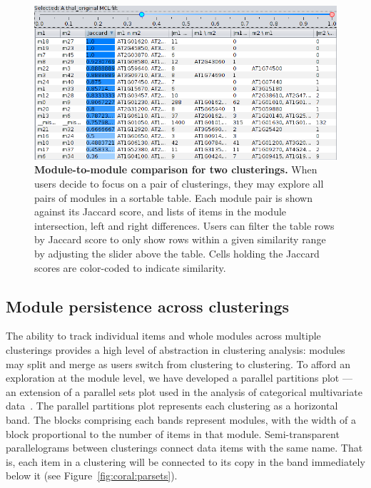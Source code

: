 \documentclass[12pt]{cmuthesis}
\begin{document}
  \begin{figure}[ht]
    \centering
    \includegraphics[width=0.8\linewidth]{figures/coral_modules}
    \caption{\textbf{Module-to-module comparison for two clusterings.} When users decide to focus on a pair of clusterings, they may explore all pairs
    of modules in a sortable table. Each module pair is shown against its Jaccard
    score, and lists of items in the module intersection, left and right
    differences. Users can filter the table rows by Jaccard score to only show rows
    within a given similarity range by adjusting the slider above the table. Cells
    holding the Jaccard scores are color-coded to indicate similarity.}
    \label{fig:coral:modules}
  \end{figure}


  \subsection{Module persistence across clusterings}

  The ability to track individual items and whole modules across multiple clusterings provides a high level of abstraction in clustering analysis: modules may split and merge as users switch from clustering to clustering. To afford an exploration at the module level, we have developed a parallel partitions plot --- an extension of a parallel sets plot used in the analysis of categorical multivariate data~\cite{Kosara2006}. The parallel partitions plot represents each clustering as a horizontal band. The blocks comprising each bands represent modules, with the width of a block proportional to the number of items in that module. Semi-transparent parallelograms between clusterings connect data items with the same name. That is, each item in a clustering will be connected to its copy in the band immediately below it (see Figure~\ref{fig:coral:parsets}).
\end{document}
